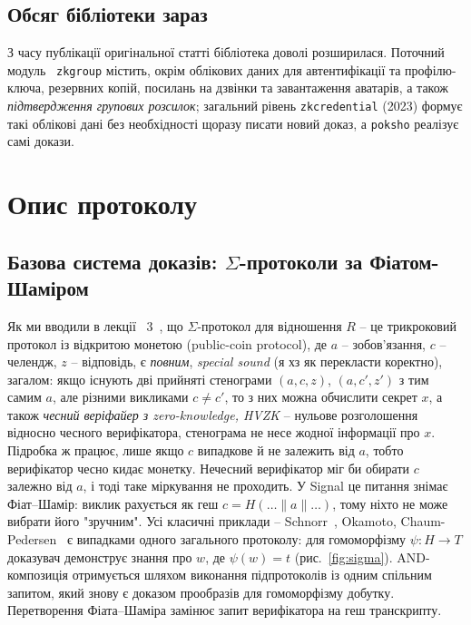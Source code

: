 \subsection{Обсяг бібліотеки зараз}
З часу публікації оригінальної статті бібліотека доволі розширилася. Поточний модуль~\cite{libsignal} \texttt{zkgroup} 
містить, окрім облікових даних для автентифікації та профілю-ключа, резервних копій, посилань на дзвінки та 
завантаження аватарів, а також  \emph{підтвердження групових розсилок}; загальний рівень \texttt{zkcredential} 
(2023) формує такі облікові дані без необхідності щоразу писати новий доказ, а \texttt{poksho} реалізує самі докази.

\section{Опис протоколу}
\label{sec:protocol}

\subsection{Базова система доказів: \texorpdfstring{$\Sigma$}{Sigma}-протоколи за Фіатом-Шаміром}
Як ми вводили в лекції \No~3~\cite{SigmaProtocols, FS86}, що $\Sigma$-протокол для відношення $R$ -- це трикроковий 
протокол із відкритою монетою (public-coin protocol), де $a$ -- зобов'язання, $c$ -- челендж, $z$ -- відповідь, 
є \emph{повним}, \emph{special sound} (я хз як перекласти коректно), загалом: якщо існують дві прийняті стенограми 
$(a,c,z)$, $(a,c',z')$ з тим самим $a$, але різними викликами $c \neq c'$, то з них можна обчислити секрет $x$, 
а також \emph{чесний веріфайер з zero-knowledge, HVZK} -- нульове розголошення відносно чесного верифікатора, 
стенограма не несе жодної інформації про $x$. Підробка ж працює, лише якщо $c$ випадкове й не залежить від $a$, 
тобто верифікатор чесно кидає монетку. Нечесний верифікатор міг би обирати $c$ залежно від $a$, і тоді таке 
міркування не проходить. У Signal це питання знімає Фіат–Шамір: виклик рахується як геш $c = H(\dots \| a \| \dots)$, 
тому ніхто не може вибрати його "зручним"{}. Усі класичні приклади -- Schnorr~\cite{Schnorr91}, Okamoto, 
Chaum-Pedersen~\cite{CP92} є випадками одного загального протоколу: для гомоморфізму $\psi:H\to T$ доказувач 
демонструє знання про $w$, де $\psi(w)=t$ (рис.~\ref{fig:sigma}). AND-композиція отримується шляхом виконання 
підпротоколів із одним спільним запитом, який знову є доказом прообразів для гомоморфізму добутку. Перетворення 
Фіата–Шаміра замінює запит верифікатора на геш транскрипту.

